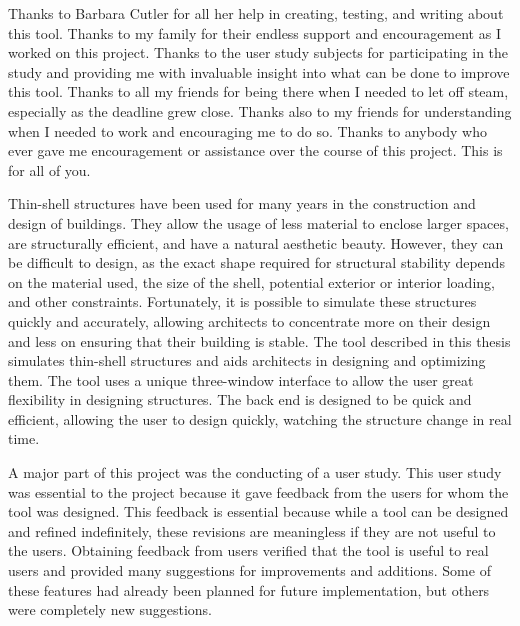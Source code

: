 \documentclass{thesis}
\author{R. Allan Pendergrast}
\begin{document}
 
\titlepage             %
\tableofcontents       %
\listoftables          %
\listoffigures         %

Thanks to Barbara Cutler for all her help in creating, testing, and writing about this tool.  Thanks to my family for their endless
support and encouragement as I worked on this project.  Thanks to the user study subjects for participating in the study and providing
me with invaluable insight into what can be done to improve this tool.  Thanks to all my friends for being there when I needed to let
off steam, especially as the deadline grew close.  Thanks also to my friends for understanding when I needed to work and encouraging
me to do so.  Thanks to anybody who ever gave me encouragement or assistance over the course of this project.  This is for all of you.

Thin-shell structures have been used for many years in the construction and design of buildings.  They allow the usage of less material to enclose
larger spaces, are structurally efficient, and have a natural aesthetic beauty.  However, they can be difficult to design, as the exact shape
required for structural stability depends on the material used, the size of the shell, potential exterior or interior loading, and other constraints.
Fortunately, it is possible to simulate these structures quickly and accurately, allowing architects to concentrate more on their design and
less on ensuring that their building is stable.  The tool described in this thesis simulates thin-shell structures and aids architects in
designing and optimizing them.  The tool uses a unique three-window interface to allow the user great flexibility in designing structures.
The back end is designed to be quick and efficient, allowing the user to design quickly, watching the structure change in real time.

A major part of this project was the conducting of a user study.  This user study was essential to the project because it gave feedback from
the users for whom the tool was designed.  This feedback is essential because while a tool can be designed and refined indefinitely, these
revisions are meaningless if they are not useful to the users.  Obtaining feedback from users verified that the tool is useful to real users
and provided many suggestions for improvements and additions.  Some of these features had already been planned for future implementation, but
others were completely new suggestions.
\end{document}

